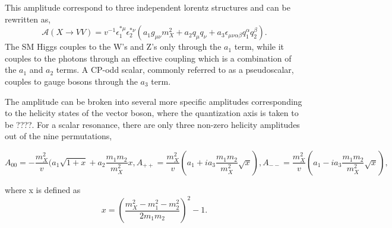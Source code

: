 This amplitude correspond to three independent
lorentz structures and can be rewritten as,
\begin{equation}
\mathscr{A}(X\to VV) = v^{-1}\epsilon_1^{*\mu}\epsilon_2^{*\nu}(a_1g_{\mu\nu}m_X^2+a_2q_\mu q_\nu+a_3\epsilon_{\mu\nu\alpha\beta}q_1^{\alpha}q_2^{\beta}). 
\end{equation}
The SM Higgs couples to the W's and Z's only through the $a_1$ term,
while it couples to the photons through an effective coupling which is a 
combination of the $a_1$ and $a_2$ terms.  A CP-odd scalar, commonly referred 
to as a pseudoscalar, couples to gauge bosons through the $a_3$ term.

The amplitude can be broken into several 
more specific amplitudes corresponding to the helicity states of the 
vector boson, where the quantization axis is taken to be ????.  For a scalar
resonance, there are only three non-zero helicity amplitudes out of the 
nine permutations,

\begin{center}
\begin{subequations}
  \begin{equation}
    A_{00} = -\frac{m_X^2}{v}(a_1\sqrt{1+x}+a_2\frac{m_1m_2}{m_X^2}x,    \end{equation}
  \begin{equation}
    A_{++} = \frac{m_X^2}{v}(a_1+ia_3\frac{m_1m_2}{m_X^2}\sqrt{x}),
    \end{equation}
  \begin{equation}
    A_{--} = \frac{m_X^2}{v}(a_1-ia_3\frac{m_1m_2}{m_X^2}\sqrt{x}),
    \end{equation}
\end{subequations}
\end{center}
where x is defined as
\begin{equation}
x=(\frac{m_X^2-m_1^2-m_2^2}{2m_1m_2})^2-1.
\end{equation}

